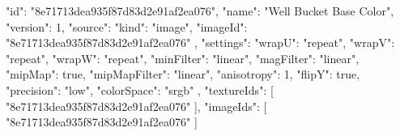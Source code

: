 {
  "id": "8e71713dea935f87d83d2e91af2ea076",
  "name": "Well Bucket Base Color",
  "version": 1,
  "source": {
    "kind": "image",
    "imageId": "8e71713dea935f87d83d2e91af2ea076"
  },
  "settings": {
    "wrapU": "repeat",
    "wrapV": "repeat",
    "wrapW": "repeat",
    "minFilter": "linear",
    "magFilter": "linear",
    "mipMap": true,
    "mipMapFilter": "linear",
    "anisotropy": 1,
    "flipY": true,
    "precision": "low",
    "colorSpace": "srgb"
  },
  "textureIds": [
    "8e71713dea935f87d83d2e91af2ea076"
  ],
  "imageIds": [
    "8e71713dea935f87d83d2e91af2ea076"
  ]
}
